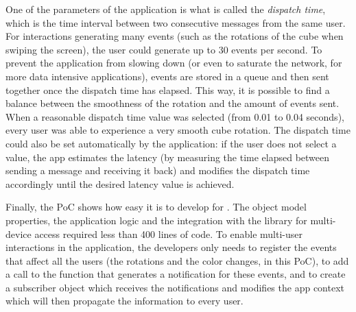 One of the parameters of the application is what is called the \emph{dispatch time}, which is the time interval between two consecutive messages from the same user. For interactions generating many events (such as the rotations of the cube when swiping the screen), the user could generate up to 30 events per second. To prevent the application from slowing down (or even to saturate the network, for more data intensive applications), events are stored in a queue and then sent together once the dispatch time has elapsed. This way, it is possible to find a balance between the smoothness of the rotation and the amount of events sent. When a reasonable dispatch time value was selected (from 0.01 to 0.04 seconds), every user was able to experience a very smooth cube rotation. The dispatch time could also be set automatically by the application: if the user does not select a value, the app estimates the latency (by measuring the time elapsed between sending a message and receiving it back) and modifies the dispatch time accordingly until the desired latency value is achieved. 

Finally, the PoC shows how easy it is to develop for \arch{}. The object model properties, the application logic and the integration with the library for multi-device access required less than 400 lines of code. To enable multi-user interactions in the application, the developers only needs to register the events that affect all the users (the rotations and the color changes, in this PoC), to add a call to the function that generates a notification for these events, and to create a subscriber object which receives the notifications and modifies the app context which will then propagate the information to every user.

